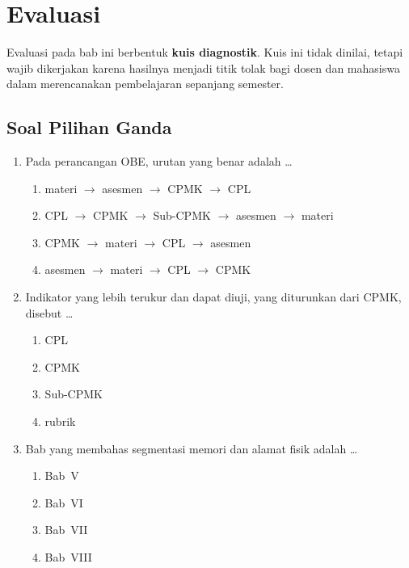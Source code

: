 \section{Evaluasi}
\label{sec:evaluasi-bab1}

Evaluasi pada bab ini berbentuk \textbf{kuis diagnostik}. Kuis ini
tidak dinilai, tetapi wajib dikerjakan karena hasilnya menjadi
titik tolak bagi dosen dan mahasiswa dalam merencanakan pembelajaran
sepanjang semester.

\subsection{Soal Pilihan Ganda}

\begin{enumerate}
    \item Pada perancangan OBE, urutan yang benar adalah \dots
          \begin{enumerate}
              \item materi $\rightarrow$ asesmen $\rightarrow$ CPMK
                    $\rightarrow$ CPL
              \item CPL $\rightarrow$ CPMK $\rightarrow$ Sub-CPMK
                    $\rightarrow$ asesmen $\rightarrow$ materi
              \item CPMK $\rightarrow$ materi $\rightarrow$ CPL
                    $\rightarrow$ asesmen
              \item asesmen $\rightarrow$ materi $\rightarrow$ CPL
                    $\rightarrow$ CPMK
          \end{enumerate}

    \item Indikator yang lebih terukur dan dapat diuji, yang
          diturunkan dari CPMK, disebut \dots
          \begin{enumerate}
              \item CPL \item CPMK
              \item Sub-CPMK \item rubrik
          \end{enumerate}

    \item Bab yang membahas segmentasi memori dan alamat fisik adalah
          \dots
          \begin{enumerate}
              \item Bab~V \item Bab~VI
              \item Bab~VII \item Bab~VIII
          \end{enumerate}


\end{enumerate}
